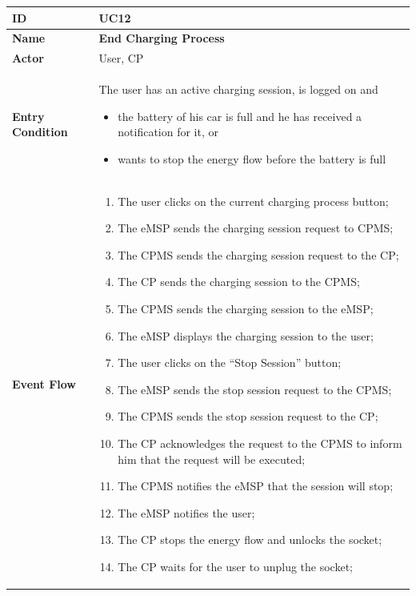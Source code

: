 \documentclass{Configuration_Files/PoliMi3i_thesis}
\begin{document}
\begin{table}[H]
    \begin{xltabular}{\textwidth}{| >{}l | X |}
    \hline
    \textbf{ID} & \textbf{UC12}\T\B\\
    \hline
    \textbf{Name} & \textbf{End Charging Process}\T\B\\
    \hline \hline
    \textbf{Actor} & User, CP\T\B \\
    \hline
    \textbf{Entry Condition} & The user has an active charging session, is logged on and
        \begin{itemize}
            \item the battery of his car is full and he has received a notification for it, or
            \item wants to stop the energy flow before the battery is full
        \end{itemize}\T\B\\
    \hline
    \textbf{Event Flow} & 
        \begin{enumerate}
        \item The user clicks on the current charging process button;
        \item The eMSP sends the charging session request to CPMS;
        \item The CPMS sends the charging session request to the CP;
        \item The CP sends the charging session to the CPMS;
        \item The CPMS sends the charging session to the eMSP;
        \item The eMSP displays the charging session to the user;
        \item The user clicks on the “Stop Session” button;
        \item The eMSP sends the stop session request to the CPMS;
        \item The CPMS sends the stop session request to the CP;
        \item The CP acknowledges the request to the CPMS to inform him that the request will be executed;
        \item The CPMS notifies the eMSP that the session will stop;
        \item The eMSP notifies the user;
        \item The CP stops the energy flow and unlocks the socket;
        \item The CP waits for the user to unplug the socket;

\end{enumerate}
\end{xltabular}
\end{table}
\end{document}
